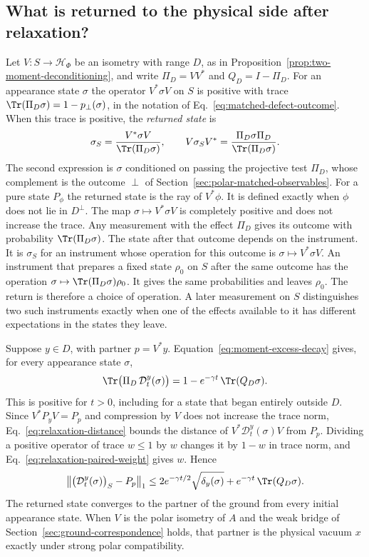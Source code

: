 \subsection{What is returned to the physical side after relaxation?}
\label{subsec:relaxation-return}
Let $V:S\to\mathcal H_\Phi$ be an isometry with range $D$, as in Proposition~\ref{prop:two-moment-deconditioning}, and write $\Pi_D=VV^*$ and $Q_D=I-\Pi_D$. For an appearance state $\sigma$ the operator $V^*\sigma V$ on $S$ is positive with trace $\Tr(\Pi_D\sigma)=1-p_\perp(\sigma)$, in the notation of Eq.~\eqref{eq:matched-defect-outcome}. When this trace is positive, the \emph{returned state} is
\begin{equation}
 \sigma_S=\frac{V^*\sigma V}{\Tr(\Pi_D\sigma)},\qquad
 V\sigma_SV^*=\frac{\Pi_D\sigma\Pi_D}{\Tr(\Pi_D\sigma)} .
 \label{eq:relaxation-return}
\end{equation}
The second expression is $\sigma$ conditioned on passing the projective test $\Pi_D$, whose complement is the outcome $\perp$ of Section~\ref{sec:polar-matched-observables}. For a pure state $P_\phi$ the returned state is the ray of $V^*\phi$. It is defined exactly when $\phi$ does not lie in $D^\perp$. The map $\sigma\mapsto V^*\sigma V$ is completely positive and does not increase the trace. Any measurement with the effect $\Pi_D$ gives its outcome with probability $\Tr(\Pi_D\sigma)$. The state after that outcome depends on the instrument. It is $\sigma_S$ for an instrument whose operation for this outcome is $\sigma\mapsto V^*\sigma V$. An instrument that prepares a fixed state $\rho_0$ on $S$ after the same outcome has the operation $\sigma\mapsto\Tr(\Pi_D\sigma)\rho_0$. It gives the same probabilities and leaves $\rho_0$. The return is therefore a choice of operation. A later measurement on $S$ distinguishes two such instruments exactly when one of the effects available to it has different expectations in the states they leave.

Suppose $y\in D$, with partner $p=V^*y$. Equation~\eqref{eq:moment-excess-decay} gives, for every appearance state $\sigma$,
\begin{equation}
 \Tr\bigl(\Pi_D\,\mathcal D_t^y(\sigma)\bigr)=1-e^{-\gamma t}\,\Tr(Q_D\sigma).
 \label{eq:relaxation-paired-weight}
\end{equation}
This is positive for $t>0$, including for a state that began entirely outside $D$. Since $V^*P_yV=P_p$ and compression by $V$ does not increase the trace norm, Eq.~\eqref{eq:relaxation-distance} bounds the distance of $V^*\mathcal D_t^y(\sigma)V$ from $P_p$. Dividing a positive operator of trace $w\le1$ by $w$ changes it by $1-w$ in trace norm, and Eq.~\eqref{eq:relaxation-paired-weight} gives $w$. Hence
\begin{equation}
 \bigl\|\bigl(\mathcal D_t^y(\sigma)\bigr)_S-P_p\bigr\|_1
 \le2e^{-\gamma t/2}\sqrt{\delta_y(\sigma)}+e^{-\gamma t}\,\Tr(Q_D\sigma).
 \label{eq:relaxation-return-bound}
\end{equation}
The returned state converges to the partner of the ground from every initial appearance state. When $V$ is the polar isometry of $A$ and the weak bridge of Section~\ref{sec:ground-correspondence} holds, that partner is the physical vacuum $x$ exactly under strong polar compatibility.


